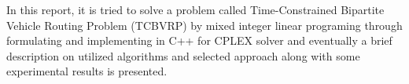 In this report, it is tried to solve a problem called Time-Constrained Bipartite
Vehicle Routing Problem (TCBVRP) by mixed integer linear programing through
formulating and implementing in C++ for CPLEX solver and eventually a brief
description on utilized algorithms and selected approach along with
some experimental results is presented.
